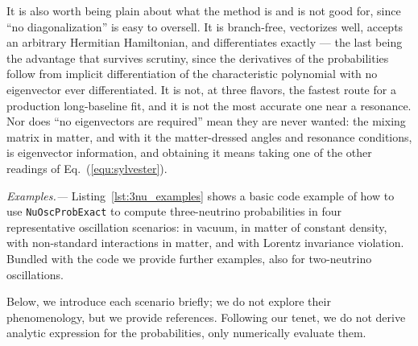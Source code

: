 \documentclass[final,5p,times,twocolumn]{elsarticle}
\newcommand{\eq}{Eq.}
\newcommand{\equ}[1]{\eq~(\ref{equ:#1})}
\providecommand{\DIFaddtex}[1]{{\protect\color{blue} \sf #1}} %
\providecommand{\DIFaddend}{} %
\providecommand{\DIFadd}[1]{\DIFaddtex{#1}} %
\begin{document}
\DIFadd{It is also worth being plain about what the method is and is not good for, since ``no diagonalization'' is easy to oversell.  It is branch-free, vectorizes well, accepts an arbitrary Hermitian Hamiltonian, and differentiates exactly --- the last being the advantage that survives scrutiny, since the derivatives of the probabilities follow from implicit differentiation of the characteristic polynomial with no eigenvector ever differentiated.  It is not, at three flavors, the fastest route for a production long-baseline fit, and it is not the most accurate one near a resonance.  Nor does ``no eigenvectors are required'' mean they are never wanted: the mixing matrix in matter, and with it the matter-dressed angles and resonance conditions, is eigenvector information, and obtaining it means taking one of the other readings of \equ{sylvester}.
}

\smallskip

{\it \DIFaddend Examples.---}  Listing\ \ref{lst:3nu_examples} shows a basic code example of how to use {\tt NuOscProbExact} to compute three-neutrino probabilities in four representative oscillation scenarios: in vacuum, in matter of constant density, with non-standard interactions in matter, and with Lorentz invariance violation.  Bundled with the code we provide further examples, also for two-neutrino oscillations.

Below, we introduce each scenario briefly; we do not explore their phenomenology, but we provide references.  Following our tenet, we do not derive analytic expression for the probabilities, only numerically evaluate them.  
\end{document}
